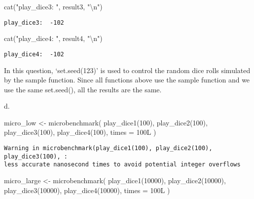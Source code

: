 \documentclass[
  letterpaper,
  DIV=11,
  numbers=noendperiod]{scrartcl}
\newenvironment{Shaded}{\begin{snugshade}}{\end{snugshade}}
\newcommand{\AttributeTok}[1]{\textcolor[rgb]{0.40,0.45,0.13}{#1}}
\newcommand{\DecValTok}[1]{\textcolor[rgb]{0.68,0.00,0.00}{#1}}
\newcommand{\FunctionTok}[1]{\textcolor[rgb]{0.28,0.35,0.67}{#1}}
\newcommand{\NormalTok}[1]{\textcolor[rgb]{0.00,0.23,0.31}{#1}}
\newcommand{\OtherTok}[1]{\textcolor[rgb]{0.00,0.23,0.31}{#1}}
\newcommand{\SpecialCharTok}[1]{\textcolor[rgb]{0.37,0.37,0.37}{#1}}
\newcommand{\StringTok}[1]{\textcolor[rgb]{0.13,0.47,0.30}{#1}}
\begin{document}
\begin{Shaded}
\begin{Highlighting}[]
\FunctionTok{cat}\NormalTok{(}\StringTok{"play\_dice3: "}\NormalTok{, result3, }\StringTok{"}\SpecialCharTok{\textbackslash{}n}\StringTok{"}\NormalTok{)}
\end{Highlighting}
\end{Shaded}

\begin{verbatim}
play_dice3:  -102 
\end{verbatim}

\begin{Shaded}
\begin{Highlighting}[]
\FunctionTok{cat}\NormalTok{(}\StringTok{"play\_dice4: "}\NormalTok{, result4, }\StringTok{"}\SpecialCharTok{\textbackslash{}n}\StringTok{"}\NormalTok{)}
\end{Highlighting}
\end{Shaded}

\begin{verbatim}
play_dice4:  -102 
\end{verbatim}

In this question, `set.seed(123)' is used to control the random dice
rolls simulated by the sample function. Since all functions above use
the sample function and we use the same set.seed(), all the results are
the same.

d.

\begin{Shaded}
\begin{Highlighting}[]
\NormalTok{micro\_low }\OtherTok{\textless{}{-}} \FunctionTok{microbenchmark}\NormalTok{(}
  \FunctionTok{play\_dice1}\NormalTok{(}\DecValTok{100}\NormalTok{),}
  \FunctionTok{play\_dice2}\NormalTok{(}\DecValTok{100}\NormalTok{),}
  \FunctionTok{play\_dice3}\NormalTok{(}\DecValTok{100}\NormalTok{),}
  \FunctionTok{play\_dice4}\NormalTok{(}\DecValTok{100}\NormalTok{),}
  \AttributeTok{times =}\NormalTok{ 100L}
\NormalTok{)}
\end{Highlighting}
\end{Shaded}

\begin{verbatim}
Warning in microbenchmark(play_dice1(100), play_dice2(100), play_dice3(100), :
less accurate nanosecond times to avoid potential integer overflows
\end{verbatim}

\begin{Shaded}
\begin{Highlighting}[]
\NormalTok{micro\_large }\OtherTok{\textless{}{-}} \FunctionTok{microbenchmark}\NormalTok{(}
  \FunctionTok{play\_dice1}\NormalTok{(}\DecValTok{10000}\NormalTok{),}
  \FunctionTok{play\_dice2}\NormalTok{(}\DecValTok{10000}\NormalTok{),}
  \FunctionTok{play\_dice3}\NormalTok{(}\DecValTok{10000}\NormalTok{),}
  \FunctionTok{play\_dice4}\NormalTok{(}\DecValTok{10000}\NormalTok{),}
  \AttributeTok{times =}\NormalTok{ 100L}
\NormalTok{)}
\end{Highlighting}
\end{Shaded}
\end{document}
